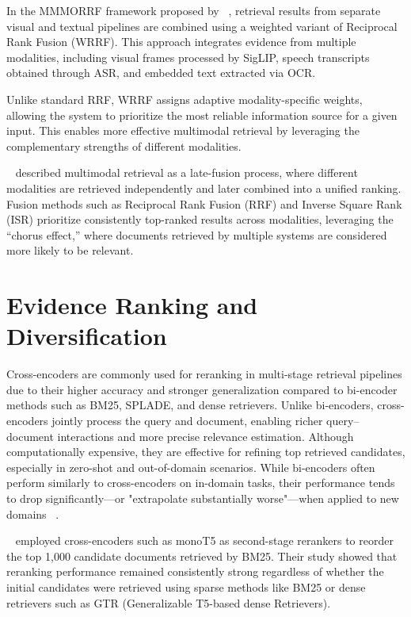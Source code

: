 In the MMMORRF framework proposed by ~\citet{Samuel2025Jul}, retrieval results from separate visual and textual pipelines are combined using a weighted variant of Reciprocal Rank Fusion (WRRF). This approach integrates evidence from multiple modalities, including visual frames processed by SigLIP, speech transcripts obtained through ASR, and embedded text extracted via OCR.

Unlike standard RRF, WRRF assigns adaptive modality-specific weights, allowing the system to prioritize the most reliable information source for a given input. This enables more effective multimodal retrieval by leveraging the complementary strengths of different modalities.

~\citet{Mourao2014Jun} described multimodal retrieval as a late-fusion process, where different modalities are retrieved independently and later combined into a unified ranking. Fusion methods such as Reciprocal Rank Fusion (RRF) and Inverse Square Rank (ISR) prioritize consistently top-ranked results across modalities, leveraging the “chorus effect,” where documents retrieved by multiple systems are considered more likely to be relevant.

\section{Evidence Ranking and Diversification}

Cross-encoders are commonly used for reranking in multi-stage retrieval pipelines due to their higher accuracy and stronger generalization compared to bi-encoder methods such as BM25, SPLADE, and dense retrievers. Unlike bi-encoders, cross-encoders jointly process the query and document, enabling richer query–document interactions and more precise relevance estimation. Although computationally expensive, they are effective for refining top retrieved candidates, especially in zero-shot and out-of-domain scenarios.
While bi-encoders often perform similarly to cross-encoders on in-domain tasks, their performance tends to drop significantly—or "extrapolate substantially worse"—when applied to new domains ~\cite{Rosa2022Dec}.

~\citet{Rosa2022Dec} employed cross-encoders such as monoT5 as second-stage rerankers to reorder the top 1,000 candidate documents retrieved by BM25. Their study showed that reranking performance remained consistently strong regardless of whether the initial candidates were retrieved using sparse methods like BM25 or dense retrievers such as GTR (Generalizable T5-based dense Retrievers).

